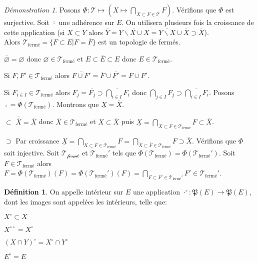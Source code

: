 \documentclass[a4paper, 11pt, french]{book}
\newenvironment{itemise}{\itemize}{\enditemize}
\theoremstyle{plain} %
\theoremstyle{definition} %
\newtheorem{definition}{Définition}
\theoremstyle{remark} %
\newtheorem*{demonstration}{Démonstration}
\renewcommand{\setminus}{\backslash}
\newcommand{\1}{\mathds{1}}
\newcommand\vide{\varnothing}
\begin{document}
\begin{demonstration}
	Posons $\Phi\colon\mathscr{T}\mapsto(X\mapsto\bigcap_{X\subset F\in\mathscr{T}}F)$.
	Vérifions que $\Phi$ est surjective.
	Soit $\overline{\cdot}$ une adhérence sur $E$.
	On utilisera plusieurs fois la croissance de cette application (si $X\subset Y$ alors $\overline{Y}=\overline{Y\setminus X\cup X}=\overline{Y\setminus X}\cup\overline{X}\supset\overline{X}$). \\
	Alors $\mathscr{T}_\text{fermé}=\{F\subset E|F=\overline{F}\}$ est un topologie de fermés.
	\begin{itemise}
		\item $\overline{\vide}=\vide$ donc $\vide\in\mathscr{T}_\text{fermé}$ et $E\subset\overline{E}\subset E$ donc $E\in\mathscr{T}_\text{fermé}$.
		\item Si $F, F'\in\mathscr{T}_\text{fermé}$ alors $\overline{F\cup F'}=\overline{F}\cup\overline{F'}=F\cup F'$.
		\item Si $F_{i\in I}\in\mathscr{T}_\text{fermé}$ alors $F_j=\overline{F_j}\supset\overline{\bigcap_{i\in I}F_i}$ donc $\bigcap_{j\in I}F_j\supset\overline{\bigcap_{i\in I}F_i}$.
	\end{itemise}
	Posons $\underline{\cdot}=\Phi(\mathscr{T}_\text{fermé})$.
	Montrons que $\underline{X}=\overline{X}$.
	\begin{itemise}
		\item[$\subset$] $\overline{\overline{X}}=\overline{X}$ donc $\overline{X}\in\mathscr{T}_\text{fermé}$ et $X\subset\overline{X}$ puis $\underline{X}=\bigcap_{X\subset F\in\mathscr{T}_\text{fermé}}F\subset\overline{X}$.
		\item[$\supset$] Par croissance $\underline{X}=\bigcap_{X\subset F\in\mathscr{T}_\text{fermé}}F=\bigcap_{\overline{X}\subset\overline{F}\in\mathscr{T}_\text{fermé}}F\supset\overline{X}$.
	\end{itemise}
	Vérifions que $\Phi$ soit injective.
	Soit $\mathscr{T_\text{fermé}}$ et $\mathscr{T}_\text{fermé}'$ tels que $\Phi(\mathscr{T}_\text{fermé})=\Phi(\mathscr{T}_\text{fermé}')$.
	Soit $F\in\mathscr{T}_\text{fermé}$ alors $F=\Phi(\mathscr{T}_\text{fermé})(F)=\Phi(\mathscr{T}_\text{fermé}')(F)=\bigcap_{F\subset F'\in\mathscr{T}_\text{fermé}'}F'\in\mathscr{T}_\text{fermé}'$.
\end{demonstration}

\begin{definition}
	On appelle intérieur sur $E$ une application $\cdot^\circ\colon\mathfrak{P}(E)\rightarrow\mathfrak{P}(E)$, dont les images sont appelées les intérieurs, telle que:
	\begin{itemise}
		\item $X^\circ\subset X$
		\item $X^{\circ\circ}=X^\circ$
		\item $(X\cap Y)^\circ=X^\circ\cap Y^\circ$
		\item $E^\circ=E$
	\end{itemise}
\end{definition}
\end{document}

